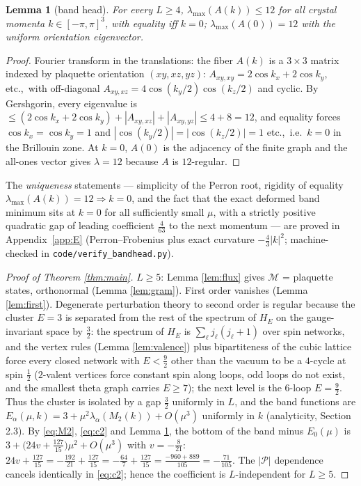 \documentclass[11pt]{article}
\newtheorem{lemma}[theorem]{Lemma}
\begin{document}
\begin{lemma}[band head]\label{lem:head}
For every $L\ge4$, $\lambda_{\max}(A(k))\le 12$ for all crystal momenta
$k\in[-\pi,\pi]^3$, with equality iff $k=0$; $\lambda_{\max}(A(0))=12$ with
the uniform orientation eigenvector.
\end{lemma}
\begin{proof}
Fourier transform in the translations: the fiber $A(k)$ is a $3\times3$
matrix indexed by plaquette orientation $(xy,xz,yz)$:
$A_{xy,xy}=2\cos k_x+2\cos k_y$, etc.,\ with off-diagonal
$A_{xy,xz}=4\cos(k_y/2)\cos(k_z/2)$ and cyclic. By Gershgorin, every
eigenvalue is $\le (2\cos k_x+2\cos k_y)+|A_{xy,xz}|+|A_{xy,yz}|
\le 4+8=12$, and equality forces $\cos k_x=\cos k_y=1$ and
$|\cos(k_y/2)|=|\cos(k_z/2)|=1$ etc.,\ i.e.\ $k=0$ in the Brillouin zone.
At $k=0$, $A(0)$ is the adjacency of the finite graph and the all-ones
vector gives $\lambda=12$ because $A$ is $12$-regular.
\end{proof}
The \emph{uniqueness} statements --- simplicity of the Perron root,
rigidity of equality $\lambda_{\max}(A(k))=12\Rightarrow k=0$, and the fact
that the exact deformed band minimum sits at $k=0$ for all sufficiently
small $\mu$, with a strictly positive quadratic gap of leading coefficient
$\tfrac{4}{63}$ to the next momentum --- are proved in
Appendix~\ref{app:E} (Perron--Frobenius plus exact curvature
$-\tfrac43|k|^2$; machine-checked in \texttt{code/verify\_bandhead.py}).

\begin{proof}[Proof of Theorem \ref{thm:main}]
$L\ge5$: Lemma \ref{lem:flux} gives $\mathcal M$ = plaquette states,
orthonormal (Lemma \ref{lem:gram}). First order vanishes
(Lemma \ref{lem:first}). Degenerate perturbation theory to second order
is regular because the cluster $E=3$ is separated from the rest of the
spectrum of $H_E$ on the gauge-invariant space by $\tfrac32$: the spectrum
of $H_E$ is $\sum_\ell j_\ell(j_\ell+1)$ over spin networks, and the vertex
rules (Lemma \ref{lem:valence}) plus bipartiteness of the cubic lattice
force every closed network with $E<\tfrac92$ other than the vacuum to be a
$4$-cycle at spin $\tfrac12$ ($2$-valent vertices force constant spin along
loops, odd loops do not exist, and the smallest theta graph carries
$E\ge7$); the next level is the $6$-loop $E=\tfrac92$. Thus the cluster is
isolated by a gap $\tfrac32$ uniformly in $L$, and the band functions are
$E_\alpha(\mu,k)=3+\mu^2\lambda_\alpha(M_2(k))+O(\mu^3)$ uniformly in $k$
(analyticity, Section 2.3). By \eqref{eq:M2}, \eqref{eq:c2} and
Lemma \ref{lem:head}, the bottom of the band minus $E_0(\mu)$ is
$3+\bigl(24v+\tfrac{127}{15}\bigr)\mu^2+O(\mu^3)$ with $v=-\tfrac8{21}$:
$24v+\tfrac{127}{15}=-\tfrac{192}{21}+\tfrac{127}{15}
=-\tfrac{64}{7}+\tfrac{127}{15}=\tfrac{-960+889}{105}=-\tfrac{71}{105}$.
The $|\mathcal P|$ dependence cancels identically in \eqref{eq:c2}; hence the
coefficient is $L$-independent for $L\ge5$.
\end{proof}
\end{document}
